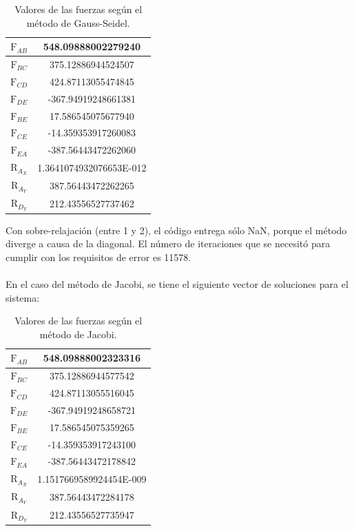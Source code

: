 \documentclass[12pt, notitlepage]{article}
\begin{document}
\begin{table}[H]
\centering
\caption{Valores de las fuerzas según el método de Gauss-Seidel.}
\begin{tabular}{|c|c|} \hline
$\text{F}_{AB}$ & 548.09888002279240 \\ \hline
$\text{F}_{BC}$ & 375.12886944524507 \\ \hline
$\text{F}_{CD}$ & 424.87113055474845 \\ \hline
$\text{F}_{DE}$ & -367.94919248661381 \\ \hline
$\text{F}_{BE}$ & 17.586545075677940 \\ \hline
$\text{F}_{CE}$ & -14.359353917260083 \\ \hline
$\text{F}_{EA}$ & -387.56443472262060 \\ \hline
$\text{R}_{A_X}$ & 1.3641074932076653E-012 \\ \hline
$\text{R}_{A_Y}$ & 387.56443472262265 \\ \hline
$\text{R}_{D_Y}$ & 212.43556527737462 \\ \hline
\end{tabular}
\end{table}

Con sobre-relajación (entre 1 y 2), el código entrega sólo NaN, porque el método diverge a causa de la diagonal. El número de iteraciones que se necesitó para cumplir con los requisitos de error es 11578.\\\\
En el caso del método de Jacobi, se tiene el siguiente vector de soluciones para el sistema:

\begin{table}[H]
\centering
\caption{Valores de las fuerzas según el método de Jacobi.}
\begin{tabular}{|c|c|} \hline
$\text{F}_{AB}$ & 548.09888002323316 \\ \hline
$\text{F}_{BC}$ & 375.12886944577542 \\ \hline
$\text{F}_{CD}$ & 424.87113055516045 \\ \hline
$\text{F}_{DE}$ & -367.94919248658721 \\ \hline
$\text{F}_{BE}$ & 17.586545075359265 \\ \hline
$\text{F}_{CE}$ & -14.359353917243100 \\ \hline
$\text{F}_{EA}$ & -387.56443472178842 \\ \hline
$\text{R}_{A_X}$ & 1.1517669589924454E-009 \\ \hline
$\text{R}_{A_Y}$ & 387.56443472284178 \\ \hline
$\text{R}_{D_Y}$ & 212.43556527735947 \\ \hline
\end{tabular}
\end{table}
\end{document}
